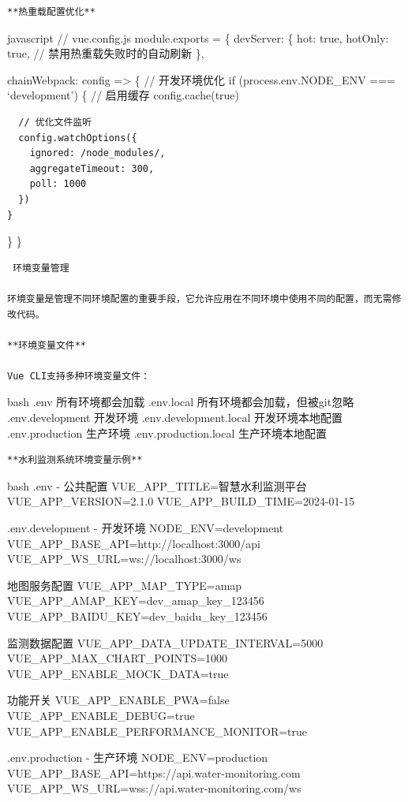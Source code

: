 {{\begin{lstlisting}
**热重载配置优化**
\end{lstlisting}

javascript // vue.config.js module.exports = \{ devServer: \{ hot: true, hotOnly: true, // 禁用热重载失败时的自动刷新 \},

chainWebpack: config =\textgreater{} \{ // 开发环境优化 if (process.env.NODE\_ENV === `development') \{ // 启用缓存 config.cache(true)

\begin{verbatim}
  // 优化文件监听
  config.watchOptions({
    ignored: /node_modules/,
    aggregateTimeout: 300,
    poll: 1000
  })
}
\end{verbatim}

\} \}

\begin{lstlisting}
 环境变量管理

环境变量是管理不同环境配置的重要手段，它允许应用在不同环境中使用不同的配置，而无需修改代码。

**环境变量文件**

Vue CLI支持多种环境变量文件：
\end{lstlisting}

bash .env  所有环境都会加载 .env.local  所有环境都会加载，但被git忽略 .env.development  开发环境 .env.development.local  开发环境本地配置 .env.production  生产环境 .env.production.local  生产环境本地配置

\begin{lstlisting}
**水利监测系统环境变量示例**
\end{lstlisting}

bash  .env - 公共配置 VUE\_APP\_TITLE=智慧水利监测平台 VUE\_APP\_VERSION=2.1.0 VUE\_APP\_BUILD\_TIME=2024-01-15

 .env.development - 开发环境 NODE\_ENV=development VUE\_APP\_BASE\_API=http://localhost:3000/api VUE\_APP\_WS\_URL=ws://localhost:3000/ws

 地图服务配置 VUE\_APP\_MAP\_TYPE=amap VUE\_APP\_AMAP\_KEY=dev\_amap\_key\_123456 VUE\_APP\_BAIDU\_KEY=dev\_baidu\_key\_123456

 监测数据配置 VUE\_APP\_DATA\_UPDATE\_INTERVAL=5000 VUE\_APP\_MAX\_CHART\_POINTS=1000 VUE\_APP\_ENABLE\_MOCK\_DATA=true

 功能开关 VUE\_APP\_ENABLE\_PWA=false VUE\_APP\_ENABLE\_DEBUG=true VUE\_APP\_ENABLE\_PERFORMANCE\_MONITOR=true

 .env.production - 生产环境 NODE\_ENV=production VUE\_APP\_BASE\_API=https://api.water-monitoring.com VUE\_APP\_WS\_URL=wss://api.water-monitoring.com/ws

}}
